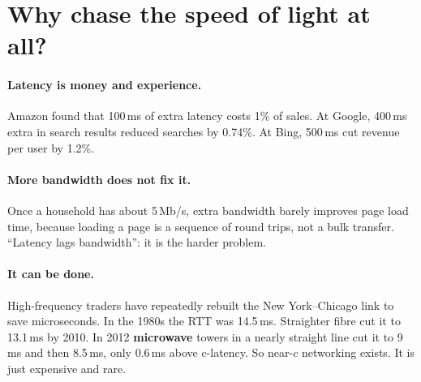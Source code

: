 \section{Why chase the speed of light at all?}

\paragraph{Latency is money and experience.} Amazon found that 100\,ms of extra latency costs 1\% of sales. At Google, 400\,ms extra in search results
reduced searches by 0.74\%. At Bing, 500\,ms cut revenue per user by 1.2\%.

\paragraph{More bandwidth does not fix it.} Once a household has about 5\,Mb/s, extra bandwidth barely improves page load time, because loading a page
is a sequence of round trips, not a bulk transfer. ``Latency lags bandwidth'': it is the harder problem.

\paragraph{It can be done.} High-frequency traders have repeatedly rebuilt the New York--Chicago link to save microseconds. In the 1980s the RTT was
14.5\,ms. Straighter fibre cut it to 13.1\,ms by 2010. In 2012 \textbf{microwave} towers in a nearly straight line cut it to 9\,ms and then 8.5\,ms, only 0.6\,ms above
c-latency. So near-$c$ networking exists. It is just expensive and rare.

